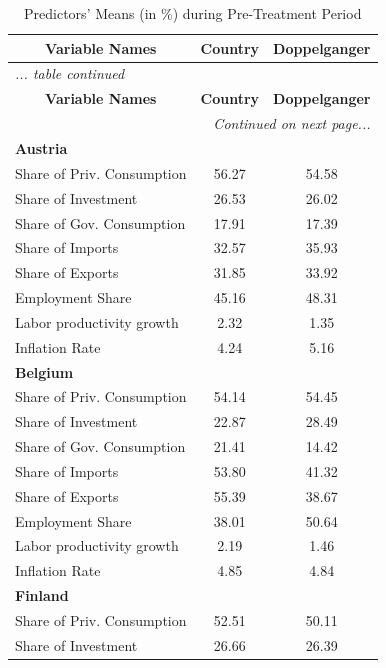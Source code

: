 \documentclass[12pt]{article}
\begin{document}
\begin{appendices}
\begin{center}
\footnotesize
\begin{longtable}{lcc}
\caption{\label{TA_comp} Predictors' Means (in \%) during Pre-Treatment Period}\\
\hline  
\hline  
 \multicolumn{1}{c}{\textbf{Variable Names}}   & \textbf{Country}  & \textbf{Doppelganger}  \\
\hline 
 \endfirsthead
\multicolumn{3}{l}{\emph{... table \thetable{} continued}} \\
\hline \hline 
 \multicolumn{1}{c}{\textbf{Variable Names}}   & \textbf{Country}  & \textbf{Doppelganger}  \\
\hline
\endhead
\hline
\multicolumn{3}{r}{\emph{Continued on next page...}}\\
\endfoot
\endlastfoot
\textbf{Austria} &  &  \\  
Share of Priv. Consumption &     56.27 &     54.58 \\  
Share of Investment &     26.53 &     26.02 \\  
Share of Gov. Consumption &     17.91 &     17.39 \\  
Share of Imports &     32.57 &     35.93 \\  
Share of Exports &     31.85 &     33.92 \\  
Employment Share &     45.16 &     48.31 \\  
Labor productivity growth &      2.32 &      1.35 \\  
Inflation Rate &      4.24 &      5.16 \\    \hline
\textbf{Belgium} &  &  \\  
Share of Priv. Consumption &     54.14 &     54.45 \\  
Share of Investment &     22.87 &     28.49 \\  
Share of Gov. Consumption &     21.41 &     14.42 \\  
Share of Imports &     53.80 &     41.32 \\  
Share of Exports &     55.39 &     38.67 \\  
Employment Share &     38.01 &     50.64 \\  
Labor productivity growth &      2.19 &      1.46 \\  
Inflation Rate &      4.85 &      4.84 \\  \hline
\textbf{Finland} &  &  \\  
Share of Priv. Consumption &     52.51 &     50.11 \\  
Share of Investment &     26.66 &     26.39 \\  

\end{longtable}
\end{center}
\end{appendices}
\end{document}
